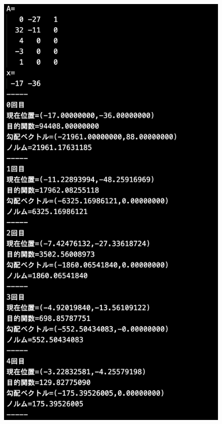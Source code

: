 \documentclass[12pt]{jarticle}
\begin{document}
\clearpage
\begin{figure}[h]
    \begin{minipage}{0.5\hsize}
        \begin{center}
            \includegraphics[scale=0.2]{kadai1_2n_out1_1_1.png}
        \end{center}

\end{minipage}
\end{figure}
\end{document}
